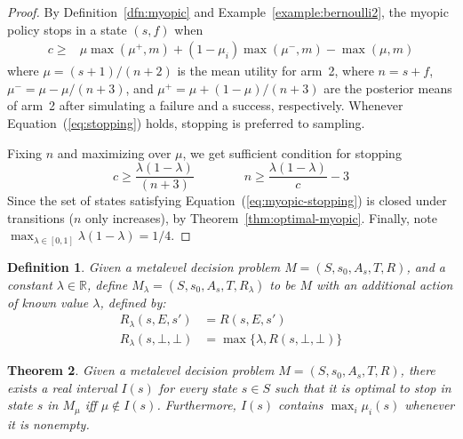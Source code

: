 \documentclass[]{article}
\newcommand {\R} {\mathbb{R}}
\newtheorem{thm}{Theorem}
\newtheorem{dfn}[thm]{Definition}
\renewcommand{\eqref}[1]{Equation~(\ref{#1})}
\newcommand{\thmref}[1]{Theorem~\ref{#1}}
\newcommand{\dfnref}[1]{Definition~\ref{#1}}
\newcommand{\exampleref}[1]{Example~\ref{#1}}
\begin{document}
	\begin{hiddenproof}
		\begin{proof}
			By \dfnref{dfn:myopic} and \exampleref{example:bernoulli2}, the myopic policy stops in
			a state $(s,f)$ when
			\begin{align}
				c \ge &\mu\max(\mu^+,m) + (1-\mu_i)\max(\mu^-, m) - \max(\mu,m) \label{eq:stopping}
			\end{align}
			where $\mu=(s+1)/(n+2)$  is the mean utility for arm~2, where $n=s+f$,
			$\mu^- = \mu - \mu/(n+3)$, and $\mu^+ = \mu + (1-\mu)/(n+3)$
			are the posterior means of arm~2 after simulating a failure and a success,
			respectively.  Whenever \eqref{eq:stopping} holds, stopping is preferred to sampling.

			Fixing $n$ and maximizing over $\mu$, we get sufficient condition for stopping
			\begin{equation}
				c \ge \frac{\lambda(1-\lambda)}{(n+3)} \qquad\qquad   n\ge \frac{\lambda(1-\lambda)}{c} - 3  \label{eq:myopic-stopping}
			\end{equation}
			Since the set of states satisfying \eqref{eq:myopic-stopping} is closed under
			transitions ($n$ only increases), by \thmref{thm:optimal-myopic}.  Finally, note $\max_{\lambda\in[0,1]} \lambda(1-\lambda)=1/4$.
		\end{proof}	
	\end{hiddenproof}
	
	\begin{dfn}\label{dfn:context}
		Given a metalevel decision problem $M=(S,s_0,A_s,T,R)$, and a constant $\lambda\in\R$,
		define $M_\lambda = (S,s_0,A_s,T,R_\lambda)$ to be $M$ with an additional action of known 
		value $\lambda$, defined by:
		\begin{align*}
			R_\lambda(s,E,s')      &= R(s,E,s') \\
			R_\lambda(s,\bot,\bot) &= \max\{\lambda, R(s,\bot,\bot)\}
		\end{align*}
	\end{dfn}

	\begin{thm}
		Given a metalevel decision problem $M=(S,s_0,A_s,T,R)$, 
		there exists a real interval $I(s)$ for every state $s\in S$ such that
		it is optimal to stop in state $s$ in $M_\mu$ iff $\mu\notin I(s)$.
		Furthermore, $I(s)$ contains $\max_i\mu_i(s)$ whenever it is nonempty.
	\end{thm}
\end{document}
